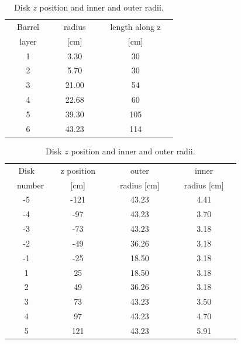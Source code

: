 \begin{table}
    \parbox{.45\linewidth}{
        \centering
\caption{Barrel-layer radii and lengths.}
\label{tab:all_si:barrel}
\begin{tabular}{c|cc}
~~Barrel~~  & ~~radius~~    & ~~length along z~~        \\
layer   & {[}cm{]}  & {[}cm{]}              \\
  \hline \hline
1       & 3.30      & 30                    \\
2       & 5.70      & 30                    \\
\hline
3       & 21.00     & 54                    \\
4       & 22.68     & 60                    \\
\hline
5       & 39.30     & 105                   \\
6       & 43.23     & 114                    
\end{tabular}
}
\parbox{.45\linewidth}{
\centering
\caption{Disk $z$ position and inner and outer radii.}
\label{tab:all_si:disks}
\begin{tabular}{c|ccc}
Disk  		& ~~z position~~	& outer 			& inner 			\\
~~number		& {[}cm{]}      & ~~radius {[}cm{]}~~	& ~~radius {[}cm{]}~~	\\
\hline \hline
-5			& -121		    & 43.23			    & 4.41			    \\
-4			& -97		    & 43.23			    & 3.70			    \\
-3			& -73		    & 43.23			    & 3.18			    \\
-2			& -49		    & 36.26			    & 3.18			    \\
-1			& -25		    & 18.50			    & 3.18			    \\
\hline
1           & 25            & 18.50			    & 3.18 			    \\
2           & 49            & 36.26			    & 3.18 			    \\
3           & 73            & 43.23			    & 3.50 			    \\
4           & 97            & 43.23			    & 4.70 			    \\
5           & 121           & 43.23             & 5.91
\end{tabular}
}
\end{table}


